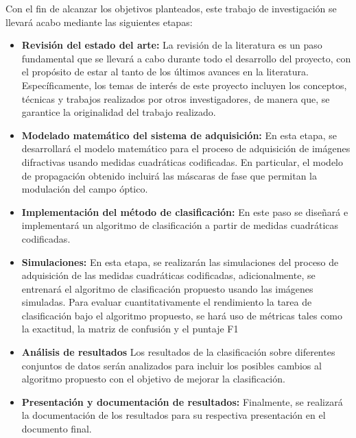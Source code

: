 
Con el fin de alcanzar los objetivos planteados, este trabajo de investigación se llevará acabo mediante las siguientes etapas:

\begin{itemize}
    \item \textbf{Revisión del estado del arte:} 
    La revisión de la literatura es un paso fundamental que se llevará a cabo durante todo el desarrollo del proyecto, con el propósito de estar al tanto de los últimos avances en la literatura. Específicamente, los temas de interés de este proyecto incluyen los conceptos, técnicas y trabajos realizados por otros investigadores, de manera que, se garantice la originalidad del trabajo realizado.
    
    \item \textbf{Modelado matemático del sistema de adquisición:}
    En esta etapa, se desarrollará el modelo matemático para el proceso de adquisición de imágenes difractivas usando medidas cuadráticas codificadas. En particular, el modelo de propagación obtenido incluirá las máscaras de fase que permitan la modulación del campo óptico.
    
    \item \textbf{Implementación del método de clasificación:}
    En este paso se diseñará e implementará un algoritmo de clasificación a partir de medidas cuadráticas codificadas. 
    
    \item \textbf{Simulaciones:}
    En esta etapa, se realizarán las simulaciones del proceso de adquisición de las medidas cuadráticas codificadas, adicionalmente, se entrenará el algoritmo de clasificación propuesto usando las imágenes simuladas. Para evaluar cuantitativamente el rendimiento la tarea de clasificación bajo el algoritmo propuesto, se hará uso de métricas tales como la exactitud, la matriz de confusión y el puntaje F1
    
    \item \textbf{Análisis de resultados}
    Los resultados de la clasificación sobre diferentes conjuntos de datos serán analizados para incluir los posibles cambios al algoritmo propuesto con el objetivo de mejorar la clasificación.

    \item \textbf{Presentación y documentación de resultados:}
    Finalmente, se realizará la documentación de los resultados para su respectiva presentación en el documento final.
    
\end{itemize}

\pagebreak